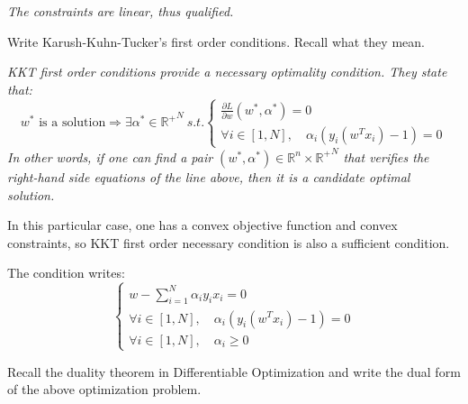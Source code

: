 \documentclass{article}
\begin{document}
{\it The constraints are linear, thus qualified.}

\noindent {} Write Karush-Kuhn-Tucker's first order conditions. Recall what they mean.

{\it KKT first order conditions provide a necessary optimality condition. They state that:
\begin{equation*}
w^* \textrm{ is a solution} \Rightarrow \exists \alpha^*\in {\mathbb{R}^+}^N \ s.t. \left\{ \begin{array}{l}
\frac{\partial L}{\partial w} (w^*, \alpha^*) = 0 \\
\forall i \in [1,N], \quad \alpha_i \left( y_i \left( w^T x_i \right) -1 \right) = 0
\end{array} \right.
\end{equation*}
In other words, if one can find a pair $(w^*,\alpha^*) \in \mathbb{R}^n \times {\mathbb{R}^+}^N$ that verifies the right-hand side equations of the line above, then it is a candidate optimal solution.

In this particular case, one has a convex objective function and convex constraints, so KKT first order necessary condition is also a sufficient condition.

The condition writes:
\begin{equation*}
\left\{\begin{array}{l}
w - \sum\limits_{i=1}^N \alpha_i y_i x_i = 0\\
\forall i \in [1,N], \quad \alpha_i \left( y_i \left( w^T x_i \right) -1 \right) = 0\\
\forall i \in [1,N], \quad \alpha_i\geq 0
\end{array}\right.
\end{equation*}
}

\noindent {} Recall the duality theorem in Differentiable Optimization and write the dual form of the above optimization problem.
\end{document}
